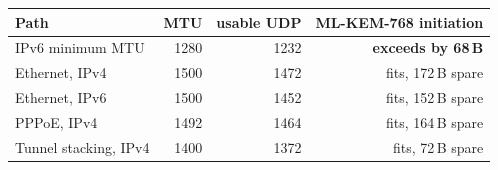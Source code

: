 \begin{tabular}{@{}lrrr@{}}
\toprule
Path & MTU & usable UDP & ML-KEM-768 initiation \\
\midrule
IPv6 minimum MTU & 1280 & 1232 & \textbf{exceeds by 68\,B} \\
Ethernet, IPv4 & 1500 & 1472 & fits, 172\,B spare \\
Ethernet, IPv6 & 1500 & 1452 & fits, 152\,B spare \\
PPPoE, IPv4 & 1492 & 1464 & fits, 164\,B spare \\
Tunnel stacking, IPv4 & 1400 & 1372 & fits, 72\,B spare \\
\bottomrule
\end{tabular}
